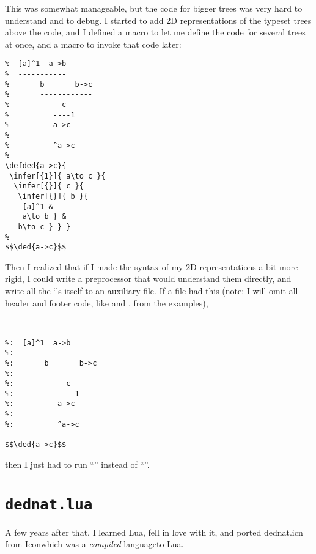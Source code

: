 \documentclass{ltugboat}
\begin{document}
This was somewhat manageable, but the code for bigger trees was very hard
to understand and to debug. I started to add 2D representations of the
typeset trees above the code, and I defined a macro  to
let me define the code for several trees at once, and a macro
\co{\\ded} to invoke that code later:

\begin{verbatim}
%  [a]^1  a->b
%  -----------
%       b       b->c
%       ------------
%            c
%          ----1
%          a->c
%
%          ^a->c
%
\defded{a->c}{
 \infer[{1}]{ a\to c }{
  \infer[{}]{ c }{
   \infer[{}]{ b }{
    [a]^1 &
    a\to b } &
   b\to c } } }
%
$$\ded{a->c}$$
\end{verbatim}


Then I realized that if I made the syntax of my 2D representations a
bit more rigid, I could write a preprocessor that would understand
them directly, and write all the `'s itself to an
auxiliary file. If a file  had this (note: I will omit
all header and footer code, like  and
, from the examples),

\begin{verbatim}


%:  [a]^1  a->b
%:  -----------
%:       b       b->c
%:       ------------
%:            c
%:          ----1
%:          a->c
%:
%:          ^a->c

$$\ded{a->c}$$
\end{verbatim}
%
then I just had to run ``''
instead of ``''.


%
\section{\texttt{dednat.lua}}
\label{dednat.lua}

A few years after that, I learned Lua, fell in love with it, and ported
dednat.icn from Icon\Dash which was a {\sl compiled} language\Dash to
Lua.
\end{document}
